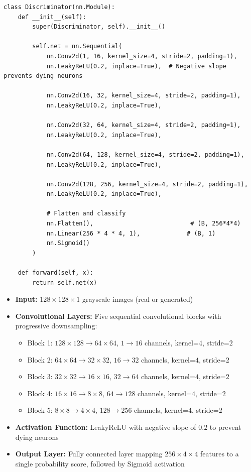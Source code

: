 \documentclass[a4paper, journal]{IEEEtran}
\begin{document}
\begin{lstlisting}[caption=Discriminator Network Architecture]
class Discriminator(nn.Module):
    def __init__(self):
        super(Discriminator, self).__init__()

        self.net = nn.Sequential(
            nn.Conv2d(1, 16, kernel_size=4, stride=2, padding=1),
            nn.LeakyReLU(0.2, inplace=True),  # Negative slope prevents dying neurons

            nn.Conv2d(16, 32, kernel_size=4, stride=2, padding=1),
            nn.LeakyReLU(0.2, inplace=True),

            nn.Conv2d(32, 64, kernel_size=4, stride=2, padding=1),
            nn.LeakyReLU(0.2, inplace=True),

            nn.Conv2d(64, 128, kernel_size=4, stride=2, padding=1),
            nn.LeakyReLU(0.2, inplace=True),

            nn.Conv2d(128, 256, kernel_size=4, stride=2, padding=1),
            nn.LeakyReLU(0.2, inplace=True),

            # Flatten and classify
            nn.Flatten(),                           # (B, 256*4*4)
            nn.Linear(256 * 4 * 4, 1),             # (B, 1)
            nn.Sigmoid()                          
        )

    def forward(self, x):
        return self.net(x)
\end{lstlisting}

\begin{itemize}
    \item \textbf{Input:} $128 \times 128 \times 1$ grayscale images (real or generated)
    \item \textbf{Convolutional Layers:} Five sequential convolutional blocks with progressive downsampling:
          \begin{itemize}
              \item Block 1: $128 \times 128 \rightarrow 64 \times 64$, $1 \rightarrow 16$ channels, kernel=$4$, stride=$2$
              \item Block 2: $64 \times 64 \rightarrow 32 \times 32$, $16 \rightarrow 32$ channels, kernel=$4$, stride=$2$
              \item Block 3: $32 \times 32 \rightarrow 16 \times 16$, $32 \rightarrow 64$ channels, kernel=$4$, stride=$2$
              \item Block 4: $16 \times 16 \rightarrow 8 \times 8$, $64 \rightarrow 128$ channels, kernel=$4$, stride=$2$
              \item Block 5: $8 \times 8 \rightarrow 4 \times 4$, $128 \rightarrow 256$ channels, kernel=$4$, stride=$2$
          \end{itemize}
    \item \textbf{Activation Function:} LeakyReLU with negative slope of $0.2$ to prevent dying neurons
    \item \textbf{Output Layer:} Fully connected layer mapping $256 \times 4 \times 4$ features to a single probability score, followed by Sigmoid activation
\end{itemize}
\end{document}
